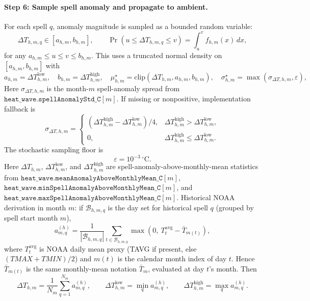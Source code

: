 \documentclass[11pt]{article}
\begin{document}
\paragraph{Step 6: Sample spell anomaly and propagate to ambient.}
For each spell \(q\), anomaly magnitude is sampled as a bounded random variable:
\begin{equation}
\label{eq:heatwave_spell_anomaly_sample}
\Delta T_{h,m,q}\in[a_{h,m},b_{h,m}],
\qquad
\Pr(u\le\Delta T_{h,m,q}\le v)=\int_u^v f_{h,m}(x)\,dx,
\end{equation}
for any \(a_{h,m}\le u\le v\le b_{h,m}\). This uses a truncated normal density on \([a_{h,m},b_{h,m}]\) with
\begin{equation}
\label{eq:heatwave_truncnorm_params}
a_{h,m}=\Delta T_{h,m}^{\mathrm{low}},
\quad
b_{h,m}=\Delta T_{h,m}^{\mathrm{high}},
\quad
\mu_{h,m}^{\star}=\mathrm{clip}(\Delta T_{h,m},a_{h,m},b_{h,m}),
\quad
\sigma_{h,m}^{\star}=\max(\sigma_{\Delta T,h,m},\varepsilon),
\end{equation}
Here \(\sigma_{\Delta T,h,m}\) is the month-\(m\) spell-anomaly spread from
\(\texttt{heat\_wave.spellAnomalyStd\_C}[m]\). If missing or nonpositive, implementation fallback is
\[
\sigma_{\Delta T,h,m}=
\begin{cases}
(\Delta T_{h,m}^{\mathrm{high}}-\Delta T_{h,m}^{\mathrm{low}})/4, & \Delta T_{h,m}^{\mathrm{high}}>\Delta T_{h,m}^{\mathrm{low}},\\
0, & \Delta T_{h,m}^{\mathrm{high}}\le\Delta T_{h,m}^{\mathrm{low}}.
\end{cases}
\]
The stochastic sampling floor is
\[
\varepsilon=10^{-3}\,^\circ\mathrm{C}.
\]
Here \(\Delta T_{h,m}\), \(\Delta T_{h,m}^{\mathrm{low}}\), and \(\Delta T_{h,m}^{\mathrm{high}}\) are spell-anomaly-above-monthly-mean statistics from
\(\texttt{heat\_wave.meanAnomalyAboveMonthlyMean\_C}[m]\),
\(\texttt{heat\_wave.minSpellAnomalyAboveMonthlyMean\_C}[m]\), and
\(\texttt{heat\_wave.maxSpellAnomalyAboveMonthlyMean\_C}[m]\).
Historical NOAA derivation in month \(m\): if \(\mathcal{B}_{h,m,q}\) is the day set for historical spell \(q\) (grouped by spell start month \(m\)),
\[
a^{(h)}_{m,q}
=\frac{1}{|\mathcal{B}_{h,m,q}|}\sum_{t\in\mathcal{B}_{h,m,q}}
\max\!\left(0,\ T^{\mathrm{avg}}_t-\bar T_{m(t)}\right),
\]
where \(T^{\mathrm{avg}}_t\) is NOAA daily mean proxy (TAVG if present, else \((TMAX+TMIN)/2\)) and \(m(t)\) is the calendar month index of day \(t\). Hence \(\bar T_{m(t)}\) is the same monthly-mean notation \(\bar T_m\), evaluated at day \(t\)'s month.
Then
\[
\Delta T_{h,m}=\frac{1}{N_m}\sum_{q=1}^{N_m}a^{(h)}_{m,q},\qquad
\Delta T_{h,m}^{\mathrm{low}}=\min_q a^{(h)}_{m,q},\qquad
\Delta T_{h,m}^{\mathrm{high}}=\max_q a^{(h)}_{m,q}.
\]
\end{document}

